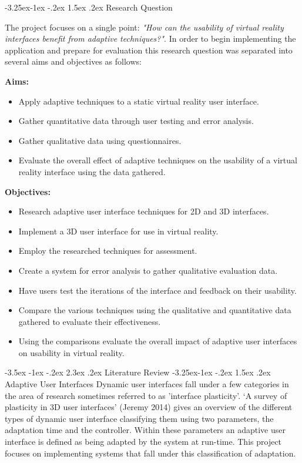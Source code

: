 \documentclass[12pt]{article}
\makeatletter
\renewcommand{\section}{\@startsection {section}{1}{\z@}%
             {-3.5ex \@plus -1ex \@minus -.2ex}%
             {2.3ex \@plus .2ex}%
             {\normalfont\Large\scshape\bfseries}}
\renewcommand{\subsection}{\@startsection{subsection}{2}{\z@}%
             {-3.25ex\@plus -1ex \@minus -.2ex}%
             {1.5ex \@plus .2ex}%
             {\normalfont\large\scshape\bfseries}}
\makeatother
\begin{document}
\subsection{Research Question} 

The project focuses on a single point: \emph{"How can the usability of virtual reality interfaces benefit from adaptive techniques?"}. In order to begin implementing the application and prepare for evaluation this research question was separated into several aims and objectives as follows:

\textbf{Aims:}
\begin{itemize}[noitemsep,topsep=0pt]
\item Apply adaptive techniques to a static virtual reality user interface.
\item Gather quantitative data through user testing and error analysis.
\item Gather qualitative data using questionnaires.
\item Evaluate the overall effect of adaptive techniques on the usability of a virtual reality interface using the data gathered.
\end{itemize}

\textbf{Objectives:}
\begin{itemize}[noitemsep,topsep=0pt]
\item Research adaptive user interface techniques for 2D and 3D interfaces.
\item Implement a 3D user interface for use in virtual reality.
\item Employ the researched techniques for assessment.
\item Create a system for error analysis to gather qualitative evaluation data.
\item Have users test the iterations of the interface and feedback on their usability.
\item Compare the various techniques using the qualitative and quantitative data gathered to evaluate their effectiveness.
\item Using the comparisons evaluate the overall impact of adaptive user interfaces on usability in virtual reality.
\end{itemize}

\section{Literature Review}
\subsection{Adaptive User Interfaces}
Dynamic user interfaces fall under a few categories in the area of research sometimes referred to as 'interface plasticity'. ‘A survey of plasticity in 3D user interfaces' (Jeremy 2014) gives an overview of the different types of dynamic user interface classifying them using two parameters, the adaptation time and the controller. Within these parameters an adaptive user interface is defined as being adapted by the system at run-time. This project focuses on implementing systems that fall under this classification of adaptation.
\end{document}
